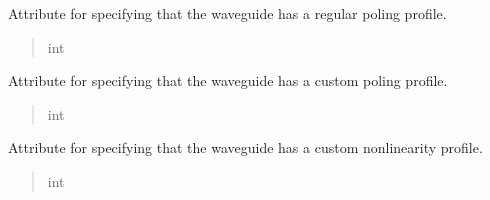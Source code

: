 \documentclass[a4paper,10pt,english]{sphinxmanual}
\begin{document}
\begin{fulllineitems}
\begin{fulllineitems}
\begin{quote}
\begin{description}
\end{description}\end{quote}

\end{fulllineitems}


\begin{fulllineitems}
\label{\detokenize{waveguide:pyjsa.waveguide.Waveguide.REGULAR_POLED}}
\pysigstartsignatures
{}
\pysigstopsignatures
\sphinxAtStartPar
Attribute for specifying that the waveguide has a regular poling profile.
\begin{quote}\begin{description}
\sphinxAtStartPar
int

\end{description}\end{quote}

\end{fulllineitems}


\begin{fulllineitems}
\label{\detokenize{waveguide:pyjsa.waveguide.Waveguide.CUSTOM_POLED}}
\pysigstartsignatures
{}
\pysigstopsignatures
\sphinxAtStartPar
Attribute for specifying that the waveguide has a custom poling profile.
\begin{quote}\begin{description}
\sphinxAtStartPar
int

\end{description}\end{quote}

\end{fulllineitems}


\begin{fulllineitems}
\label{\detokenize{waveguide:pyjsa.waveguide.Waveguide.CUSTOM}}
\pysigstartsignatures
{}
\pysigstopsignatures
\sphinxAtStartPar
Attribute for specifying that the waveguide has a custom nonlinearity profile.
\begin{quote}\begin{description}
\sphinxAtStartPar
int


\end{description}
\end{quote}
\end{fulllineitems}
\end{fulllineitems}
\end{document}
